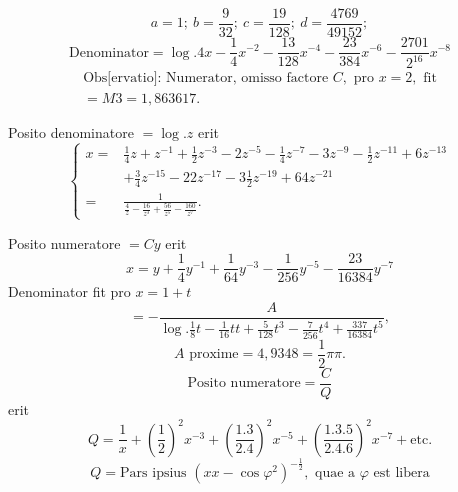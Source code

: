 \[a=1;\ b=\frac9{32};\ c=\frac{19}{128};\ d=\frac{4769}{49152};\]
{\small\begin{equation}\tag*{[8]}\text{Denominator}=\log.4x-\frac14x^{-2}-\frac{13}{128}x^{-4}-\frac{23}{384}x^{-6}-\frac{2701}{2^{16}}x^{-8}\end{equation}}
\ClosingRule
\begin{equation}\tag*{[9]}\begin{gathered}
\text{Obs[ervatio]: Numerator, omisso factore }C,\text{ pro }x=2,\text{ fit}\\
=M3=1{,}863617.
\end{gathered}\end{equation}
\par\indent Posito denominatore \(=\log.z\) erit
{\small\begin{equation}\tag*{[10]}\left\{\begin{aligned}
x={}&\frac14z+z^{-1}+\frac12z^{-3}-2z^{-5}-\frac14z^{-7}-3z^{-9}-\frac12z^{-11}+6z^{-13}\\
&+\frac34z^{-15}-22z^{-17}-3\frac12z^{-19}+64z^{-21}\\
={}&\frac1{\frac4z-\frac{16}{z^3}+\frac{56}{z^5}-\frac{160}{z^7}}.
\end{aligned}\right.\end{equation}}
\par\indent Posito numeratore \(=Cy\) erit
\begin{equation}\tag*{[11]}x=y+\frac14y^{-1}+\frac1{64}y^{-3}-\frac1{256}y^{-5}-\frac{23}{16384}y^{-7}\end{equation}
\noindent Denominator fit pro \(x=1+t\)
\clearpage
{}
\begin{equation}\tag*{[12]}=-\frac{A}{\log.\frac18t-\frac1{16}tt+\frac5{128}t^3-\frac7{256}t^4+\frac{337}{16384}t^5},\end{equation}
\[A\text{ proxime}=4{,}9348=\frac12\pi\pi.\]
\noindent [S. 11]
\begin{equation}\tag*{[13]}\text{Posito numeratore}=\frac CQ\end{equation}
\noindent erit
\begin{equation}\tag*{[14]}Q=\frac1x+\left(\frac12\right)^2x^{-3}
+\left(\frac{1.3}{2.4}\right)^2x^{-5}
+\left(\frac{1.3.5}{2.4.6}\right)^2x^{-7}+\text{etc.}\end{equation}
\begin{equation}\tag*{[15]}Q=\text{Pars ipsius }(xx-\cos\varphi^2)^{-\frac12},\text{ quae a }\varphi\text{ est libera}\end{equation}
